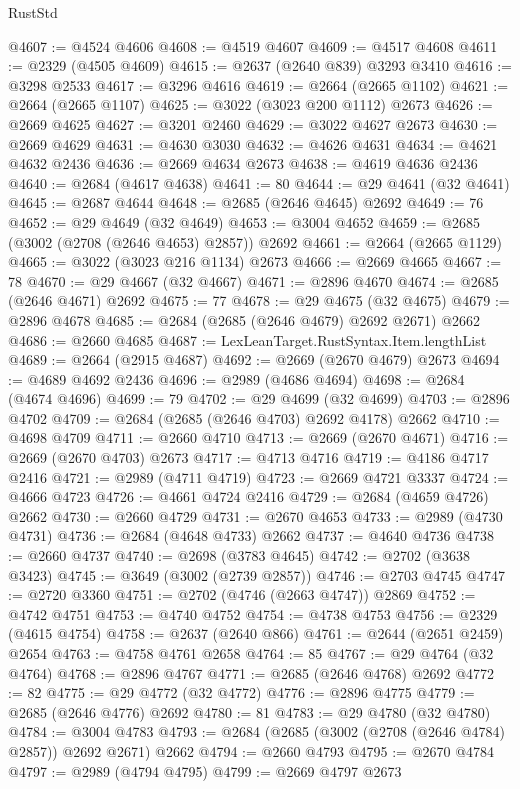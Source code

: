 \begin{lexlean}{RustStd}
\begin{coremodule}
@4607 := @4524 @4606
@4608 := @4519 @4607
@4609 := @4517 @4608
@4611 := @2329 (@4505 @4609)
@4615 := @2637 (@2640 @839) @3293 @3410
@4616 := @3298 @2533
@4617 := @3296 @4616
@4619 := @2664 (@2665 @1102)
@4621 := @2664 (@2665 @1107)
@4625 := @3022 (@3023 @200 @1112) @2673
@4626 := @2669 @4625
@4627 := @3201 @2460
@4629 := @3022 @4627 @2673
@4630 := @2669 @4629
@4631 := @4630 @3030
@4632 := @4626 @4631
@4634 := @4621 @4632 @2436
@4636 := @2669 @4634 @2673
@4638 := @4619 @4636 @2436
@4640 := @2684 (@4617 @4638)
@4641 := 80
@4644 := @29 @4641 (@32 @4641)
@4645 := @2687 @4644
@4648 := @2685 (@2646 @4645) @2692
@4649 := 76
@4652 := @29 @4649 (@32 @4649)
@4653 := @3004 @4652
@4659 := @2685 (@3002 (@2708 (@2646 @4653) @2857)) @2692
@4661 := @2664 (@2665 @1129)
@4665 := @3022 (@3023 @216 @1134) @2673
@4666 := @2669 @4665
@4667 := 78
@4670 := @29 @4667 (@32 @4667)
@4671 := @2896 @4670
@4674 := @2685 (@2646 @4671) @2692
@4675 := 77
@4678 := @29 @4675 (@32 @4675)
@4679 := @2896 @4678
@4685 := @2684 (@2685 (@2646 @4679) @2692 @2671) @2662
@4686 := @2660 @4685
@4687 := LexLeanTarget.RustSyntax.Item.lengthList
@4689 := @2664 (@2915 @4687)
@4692 := @2669 (@2670 @4679) @2673
@4694 := @4689 @4692 @2436
@4696 := @2989 (@4686 @4694)
@4698 := @2684 (@4674 @4696)
@4699 := 79
@4702 := @29 @4699 (@32 @4699)
@4703 := @2896 @4702
@4709 := @2684 (@2685 (@2646 @4703) @2692 @4178) @2662
@4710 := @4698 @4709
@4711 := @2660 @4710
@4713 := @2669 (@2670 @4671)
@4716 := @2669 (@2670 @4703) @2673
@4717 := @4713 @4716
@4719 := @4186 @4717 @2416
@4721 := @2989 (@4711 @4719)
@4723 := @2669 @4721 @3337
@4724 := @4666 @4723
@4726 := @4661 @4724 @2416
@4729 := @2684 (@4659 @4726) @2662
@4730 := @2660 @4729
@4731 := @2670 @4653
@4733 := @2989 (@4730 @4731)
@4736 := @2684 (@4648 @4733) @2662
@4737 := @4640 @4736
@4738 := @2660 @4737
@4740 := @2698 (@3783 @4645)
@4742 := @2702 (@3638 @3423)
@4745 := @3649 (@3002 (@2739 @2857))
@4746 := @2703 @4745
@4747 := @2720 @3360
@4751 := @2702 (@4746 (@2663 @4747)) @2869
@4752 := @4742 @4751
@4753 := @4740 @4752
@4754 := @4738 @4753
@4756 := @2329 (@4615 @4754)
@4758 := @2637 (@2640 @866)
@4761 := @2644 (@2651 @2459) @2654
@4763 := @4758 @4761 @2658
@4764 := 85
@4767 := @29 @4764 (@32 @4764)
@4768 := @2896 @4767
@4771 := @2685 (@2646 @4768) @2692
@4772 := 82
@4775 := @29 @4772 (@32 @4772)
@4776 := @2896 @4775
@4779 := @2685 (@2646 @4776) @2692
@4780 := 81
@4783 := @29 @4780 (@32 @4780)
@4784 := @3004 @4783
@4793 := @2684 (@2685 (@3002 (@2708 (@2646 @4784) @2857)) @2692 @2671) @2662
@4794 := @2660 @4793
@4795 := @2670 @4784
@4797 := @2989 (@4794 @4795)
@4799 := @2669 @4797 @2673

\end{coremodule}
\end{lexlean}
